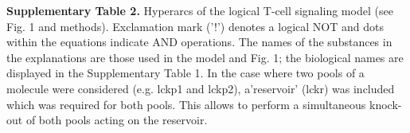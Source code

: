 \documentclass[a4paper, 12pt,epsfig, onecolumn]{article}
\begin{document}
{\sf


\noindent
\textbf{Supplementary Table 2.} Hyperarcs of the logical T-cell signaling model (see  Fig. 1 and methods). Exclamation mark ('!') denotes a logical NOT and dots within the
  equations indicate AND operations. The names of the substances in the  explanations are those used in the model and Fig. 1; the biological names are displayed in the Supplementary Table 1. In the
  case where two pools of a molecule were considered (e.g. lckp1 and lckp2),
  a'reservoir' (lckr) was included which was required for both pools. This
  allows to perform a simultaneous knock-out of both pools acting on the reservoir.



\begin{center}
\begin{longtable}{|p{}|p{}|p{}|p{}|}
\hline


\end{longtable}
\end{center}}
\end{document}
